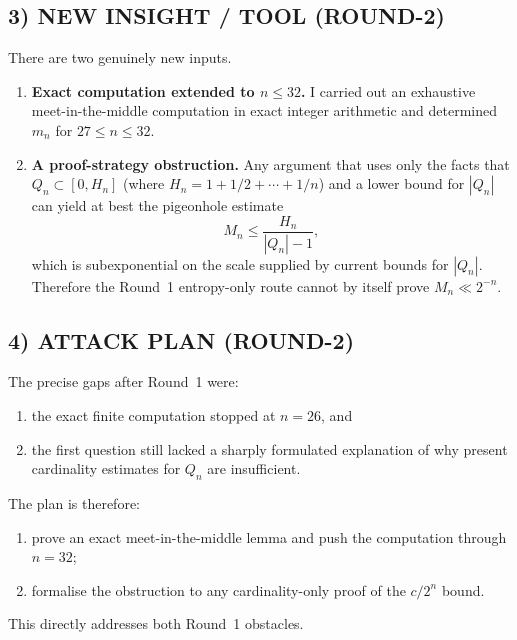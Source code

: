 \subsection*{3) NEW INSIGHT / TOOL (ROUND-2)}
There are two genuinely new inputs.
\begin{enumerate}
\item \textbf{Exact computation extended to $n\le 32$.}
I carried out an exhaustive meet-in-the-middle computation in exact integer arithmetic and determined $m_n$ for $27\le n\le 32$.
\item \textbf{A proof-strategy obstruction.}
Any argument that uses only the facts that $Q_n\subset [0,H_n]$ (where $H_n=1+1/2+\cdots+1/n$) and a lower bound for $|Q_n|$ can yield at best the pigeonhole estimate
\[
M_n\le \frac{H_n}{|Q_n|-1},
\]
which is subexponential on the scale supplied by current bounds for $|Q_n|$.  Therefore the Round~1 entropy-only route cannot by itself prove $M_n\ll 2^{-n}$.
\end{enumerate}

\subsection*{4) ATTACK PLAN (ROUND-2)}
The precise gaps after Round~1 were:
\begin{enumerate}
\item the exact finite computation stopped at $n=26$, and
\item the first question still lacked a sharply formulated explanation of why present cardinality estimates for $Q_n$ are insufficient.
\end{enumerate}
The plan is therefore:
\begin{enumerate}
\item prove an exact meet-in-the-middle lemma and push the computation through $n=32$;
\item formalise the obstruction to any cardinality-only proof of the $c/2^n$ bound.
\end{enumerate}
This directly addresses both Round~1 obstacles.

